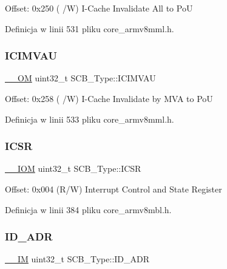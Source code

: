Offset\+: 0x250 ( /W) I-\/\+Cache Invalidate All to PoU 

Definicja w linii 531 pliku core\+\_\+armv8mml.\+h.

\mbox{\label{struct_s_c_b___type_a5eca5a3e5aedd89a9655df8f5798e2b0}} 
\subsubsection{\texorpdfstring{I\+C\+I\+M\+V\+AU}{ICIMVAU}}
{\footnotesize\ttfamily \hyperlink{core__sc300_8h_a0ea2009ed8fd9ef35b48708280fdb758}{\+\_\+\+\_\+\+OM} uint32\+\_\+t S\+C\+B\+\_\+\+Type\+::\+I\+C\+I\+M\+V\+AU}

Offset\+: 0x258 ( /W) I-\/\+Cache Invalidate by M\+VA to PoU 

Definicja w linii 533 pliku core\+\_\+armv8mml.\+h.

\mbox{\label{struct_s_c_b___type_a0ca18ef984d132c6bf4d9b61cd00f05a}} 
\subsubsection{\texorpdfstring{I\+C\+SR}{ICSR}}
{\footnotesize\ttfamily \hyperlink{core__sc300_8h_ab6caba5853a60a17e8e04499b52bf691}{\+\_\+\+\_\+\+I\+OM} uint32\+\_\+t S\+C\+B\+\_\+\+Type\+::\+I\+C\+SR}

Offset\+: 0x004 (R/W) Interrupt Control and State Register 

Definicja w linii 384 pliku core\+\_\+armv8mbl.\+h.

\mbox{\label{struct_s_c_b___type_aa5c5a6ccc7042927ce3feadc41872aa4}} 
\subsubsection{\texorpdfstring{I\+D\+\_\+\+A\+DR}{ID\_ADR}}
{\footnotesize\ttfamily \hyperlink{core__sc300_8h_a4cc1649793116d7c2d8afce7a4ffce43}{\+\_\+\+\_\+\+IM} uint32\+\_\+t S\+C\+B\+\_\+\+Type\+::\+I\+D\+\_\+\+A\+DR}

